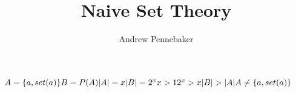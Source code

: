 \documentclass{article}
\title{Naive Set Theory}
\author{Andrew Pennebaker}
\begin{document}
\maketitle

\noindent
$
A = \{ a, set(a) \}
\\\\
B = P(A)
\\\\
|A| = x
\\\\
|B| = 2^x
\\\\
x > 1
\\\\
2^x > x
\\\\
|B| > |A|
\\\\
A \neq \{ a, set(a) \}
$
\end{document}
